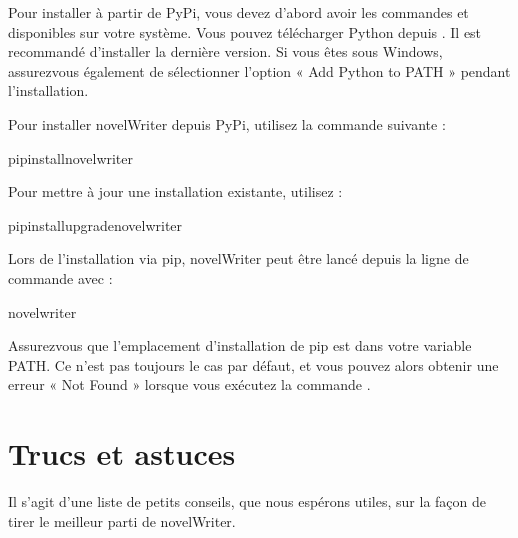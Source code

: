 \documentclass[a4paper,11pt,french]{sphinxmanual}
\begin{document}
\sphinxAtStartPar
Pour installer à partir de PyPi, vous devez d’abord avoir les commandes  et  disponibles sur votre système. Vous pouvez télécharger Python depuis . Il est recommandé d’installer la dernière version. Si vous êtes sous Windows, assurez\sphinxhyphen{}vous également de sélectionner l’option « Add Python to PATH » pendant l’installation.

\sphinxAtStartPar
Pour installer novelWriter depuis PyPi, utilisez la commande suivante :

\begin{sphinxVerbatim}[commandchars=\\\{\}]
pipinstallnovelwriter
\end{sphinxVerbatim}

\sphinxAtStartPar
Pour mettre à jour une installation existante, utilisez :

\begin{sphinxVerbatim}[commandchars=\\\{\}]
pipinstall\PYGZhy{}\PYGZhy{}upgradenovelwriter
\end{sphinxVerbatim}

\sphinxAtStartPar
Lors de l’installation via pip, novelWriter peut être lancé depuis la ligne de commande avec :

\begin{sphinxVerbatim}[commandchars=\\\{\}]
novelwriter
\end{sphinxVerbatim}

\sphinxAtStartPar
Assurez\sphinxhyphen{}vous que l’emplacement d’installation de pip est dans votre variable PATH. Ce n’est pas toujours le cas par défaut, et vous pouvez alors obtenir une erreur « Not Found » lorsque vous exécutez la commande .

\sphinxstepscope


\chapter{Trucs et astuces}
\label{\detokenize{int_howto:tips-tricks}}\label{\detokenize{int_howto:a-howto}}\label{\detokenize{int_howto::doc}}
\sphinxAtStartPar
Il s’agit d’une liste de petits conseils, que nous espérons utiles, sur la façon de tirer le meilleur parti de novelWriter.
\end{document}
